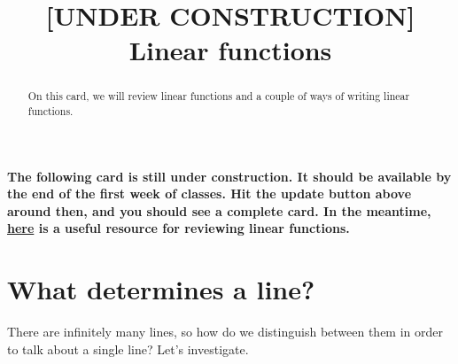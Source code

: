 \documentclass{ximera}
\title[Dig-In:]{[UNDER CONSTRUCTION] Linear functions}
\begin{document}
\begin{abstract}
On this card, we will review linear functions and a couple of ways of writing linear functions. 
\end{abstract}
\maketitle

\textbf{The following card is still under construction.  It should be available by the end of the first week of classes.  Hit the update button above around then, and you should see a complete card.  In the meantime, \href{http://tutorial.math.lamar.edu/Classes/Alg/Lines.aspx}{here} is a useful resource for reviewing linear functions.}

\section{What determines a line?}

There are infinitely many lines, so how do we distinguish between them in order to talk about a single line?  Let's investigate. 
\end{document}
